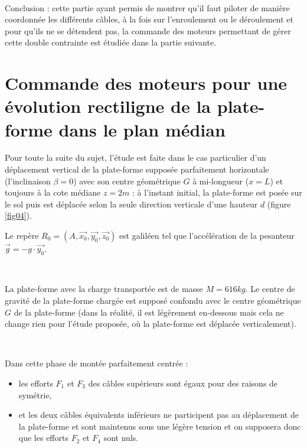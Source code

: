 
~\

Conclusion : cette partie ayant permis de montrer qu’il faut piloter de manière coordonnée les différents câbles, à la fois sur l’enroulement ou le déroulement et pour qu’ils ne se détendent pas, la commande des moteurs permettant de gérer cette double contrainte est étudiée dans la partie suivante.

\section{Commande des moteurs pour une évolution rectiligne de la plate-forme dans le plan médian}


Pour toute la suite du sujet, l’étude est faite dans le cas particulier d’un déplacement vertical de la plate-forme supposée parfaitement horizontale (l’inclinaison $\beta=0$) avec son centre géométrique $G$ à mi-longueur ($x=L$)
et toujours à la cote médiane $z=2m$ : à l’instant initial, la plate-forme est posée sur le sol puis est déplacée selon la seule direction verticale d’une hauteur $d$ (figure \ref{fig04}).

Le repère $R_0=(A,\vec{x_0},\vec{y_0},\vec{z_0})$ est galiléen tel que l’accélération de la pesanteur $\vec{g}=-g\cdot\vec{y_0}$.

~\

La plate-forme avec la charge transportée est de masse $M=616kg$. Le centre de gravité de la plate-forme chargée est supposé confondu avec le centre géométrique $G$ de la plate-forme (dans la réalité, il est légèrement en-dessous mais cela ne change rien pour l’étude proposée, où la plate-forme est déplacée verticalement).

~\

Dans cette phase de montée parfaitement centrée :
\begin{itemize}
 \item les efforts $F_1$ et $F_3$ des câbles supérieurs sont égaux pour des raisons de symétrie,
 \item et les deux câbles équivalents inférieurs ne participent pas au déplacement de la plate-forme et sont maintenus sous une légère tension et on supposera donc que les efforts $F_2$ et $F_4$ sont nuls.
\end{itemize}

